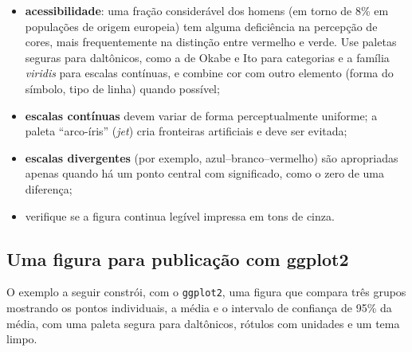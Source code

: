 \documentclass[
]{book}
\providecommand{\tightlist}{%
  \setlength{\itemsep}{0pt}\setlength{\parskip}{0pt}}
\begin{document}
\begin{itemize}
\tightlist
\item
  \textbf{acessibilidade}: uma fração considerável dos homens (em torno de 8\% em populações de origem europeia) tem alguma deficiência na percepção de cores, mais frequentemente na distinção entre vermelho e verde. Use paletas seguras para daltônicos, como a de Okabe e Ito para categorias e a família \emph{viridis} para escalas contínuas, e combine cor com outro elemento (forma do símbolo, tipo de linha) quando possível;
\item
  \textbf{escalas contínuas} devem variar de forma perceptualmente uniforme; a paleta ``arco-íris'' (\emph{jet}) cria fronteiras artificiais e deve ser evitada;
\item
  \textbf{escalas divergentes} (por exemplo, azul--branco--vermelho) são apropriadas apenas quando há um ponto central com significado, como o zero de uma diferença;
\item
  verifique se a figura continua legível impressa em tons de cinza.
\end{itemize}

\subsection{Uma figura para publicação com ggplot2}\label{uma-figura-para-publicauxe7uxe3o-com-ggplot2}

O exemplo a seguir constrói, com o \texttt{ggplot2}, uma figura que compara três grupos mostrando os pontos individuais, a média e o intervalo de confiança de 95\% da média, com uma paleta segura para daltônicos, rótulos com unidades e um tema limpo.
\end{document}
